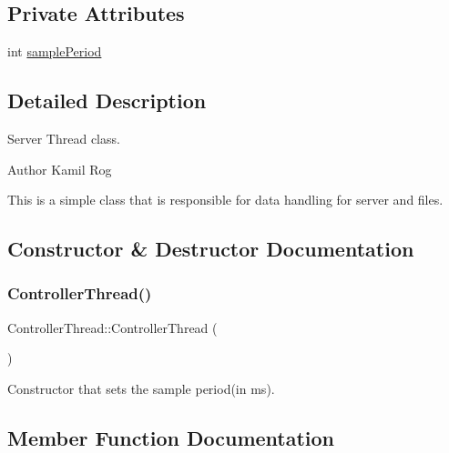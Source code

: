 \subsection*{Private Attributes}
\begin{DoxyCompactItemize}
\item 
int \hyperlink{classControllerThread_a5dcd0069c7d31295c7e1e598c31fadf7}{sample\+Period}
\end{DoxyCompactItemize}


\subsection{Detailed Description}
Server Thread class. 

\begin{DoxyAuthor}{Author}
Kamil Rog
\end{DoxyAuthor}
This is a simple class that is responsible for data handling for server and files. 

\subsection{Constructor \& Destructor Documentation}
\mbox{\label{classControllerThread_a00cd6502504f5f1e680e6be3f60a987d}} 
\subsubsection{\texorpdfstring{Controller\+Thread()}{ControllerThread()}}
{\footnotesize\ttfamily Controller\+Thread\+::\+Controller\+Thread (\begin{DoxyParamCaption}{ }\end{DoxyParamCaption})\hspace{0.3cm}{\ttfamily [inline]}}

Constructor that sets the sample period(in ms). 

\subsection{Member Function Documentation}
\mbox{\label{classCppThread_a8ff0fda6b913cc53764caef0e1200f3f}} 
